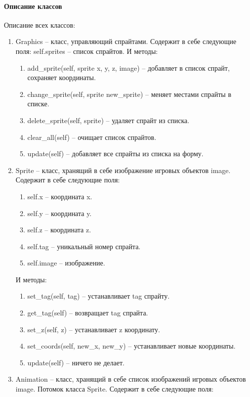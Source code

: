 \paragraph{Описание классов}
Описание всех классов:
\begin{enumerate}
	\item Graphics -- класс, управляющий спрайтами. Содержит в себе следующие поля: self.sprites -- список спрайтов. И методы:
		\begin{enumerate}
			\item add\_sprite(self, sprite x, y, z, image) -- добавляет в список спрайт, сохраняет координаты.
			\item change\_sprite(self, sprite new\_sprite) -- меняет местами спрайты в списке.
			\item delete\_sprite(self, sprite) -- удаляет спрайт из списка.
			\item clear\_all(self) -- очищает список спрайтов.
			\item update(self) -- добавляет все спрайты из списка на форму.
		\end{enumerate}
	\item Sprite -- класс, хранящий в себе изображение игровых объектов image. Содержит в себе следующие поля:
		\begin{enumerate}
			\item self.x -- координата x.
			\item self.y -- координата y.
			\item self.z -- координата z.
			\item self.tag -- уникальный номер спрайта.
			\item self.image -- изображение.
		\end{enumerate}
		И методы:
		\begin{enumerate}
			\item set\_tag(self, tag) -- устанавливает tag спрайту.
			\item get\_tag(self) -- возвращает tag спрайта.
			\item set\_z(self, z) -- устанавливает z координату.
			\item set\_coords(self, new\_x, new\_y) -- устанавливает новые координаты.
			\item update(self) -- ничего не делает.
		\end{enumerate}
	\item Animation -- класс, хранящий в себе список изображений игровых объектов image. Потомок класса Sprite.  Содержит в себе следующие поля:
		\begin{enumerate}

\end{enumerate}
\end{enumerate}
